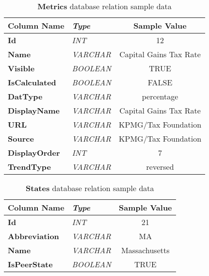 \begin{appendices}
		\begin{table}[h]
			\centering
			\begin{tabularx}{\textwidth}{@{} >{\bf}Y >{\em}l c @{}} %
				\toprule
				Column Name		& Type		& Sample Value				\\
				\midrule
				
				Id				& INT		& 12						\\
				Name			& VARCHAR	& Capital Gains Tax Rate	\\
				Visible			& BOOLEAN	& TRUE						\\
				IsCalculated	& BOOLEAN	& FALSE						\\
				DatType			& VARCHAR	& percentage				\\
				DisplayName		& VARCHAR	& Capital Gains Tax Rate	\\
				URL				& VARCHAR	& KPMG/Tax Foundation		\\
				Source			& VARCHAR	& KPMG/Tax Foundation		\\
				DisplayOrder	& INT		& 7							\\
				TrendType		& VARCHAR	& reversed					\\
				
				\bottomrule
			\end{tabularx}
			\caption{\textbf{Metrics} database relation sample data}
			\label{tbl:metrictable}
		\end{table}
		
		\begin{table}[h]
			\centering
			\begin{tabularx}{\textwidth}{@{} >{\bf}Y >{\em}l c @{}} %
				\toprule
				Column Name		& Type		& Sample Value	\\
				\midrule
				
				Id				& INT		& 21			\\
				Abbreviation	& VARCHAR	& MA			\\
				Name			& VARCHAR	& Massachusetts	\\
				IsPeerState		& BOOLEAN	& TRUE			\\
				
				\bottomrule
			\end{tabularx}
			\caption{\textbf{States} database relation sample data}
			\label{tbl:statestable}
		\end{table}

\end{appendices}